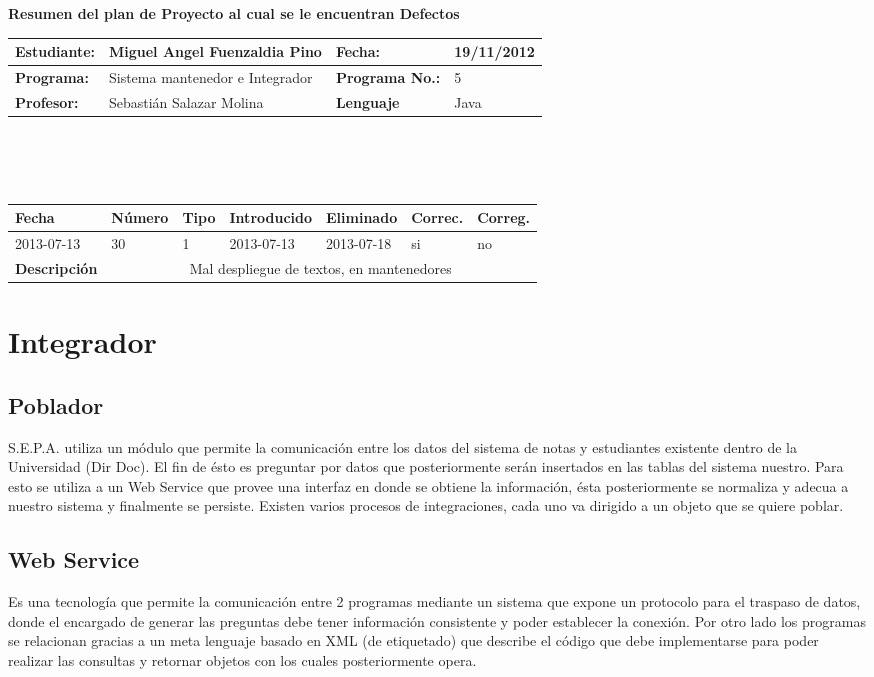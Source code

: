 \documentclass[a4paper,12pt,openany,oneside]{book}
\begin{document}
\textbf{Resumen del plan de Proyecto al cual se le encuentran Defectos}\\
\begin{tabular}{| l | l | l | l |}
\hline
\textbf{Estudiante:} & Miguel Angel Fuenzaldia Pino & \textbf{Fecha:} & 19/11/2012\\
\hline
\textbf{Programa:} & Sistema mantenedor e Integrador & \textbf{Programa No.:} & 5\\
\hline
\textbf{Profesor:} & Sebastián Salazar Molina & \textbf{Lenguaje} & Java  \\
\hline
\end{tabular}
\\\\\\
\begin{tabular}{| l | l | l | l | l | l | l |}
\hline
\textbf{Fecha} & \textbf{Número} & \textbf{Tipo} & \textbf{Introducido} & \textbf{Eliminado} & \textbf{Correc.} & \textbf{Correg.}\\
\hline
2013-07-13 & 30 & 1 & 2013-07-13 & 2013-07-18 & si & no \\
\hline
\textbf{Descripción} & \multicolumn{6}{|c|}{Mal despliegue de textos, en mantenedores} \\
\hline
\end{tabular}

\chapter{Integrador}
\thispagestyle{empty}
\section{Poblador}
S.E.P.A. utiliza un módulo que permite la comunicación entre los datos del sistema de notas y estudiantes existente dentro de la Universidad (Dir Doc). El fin de ésto es preguntar por datos que posteriormente serán insertados en las tablas del sistema nuestro. Para esto se utiliza a un Web Service que provee una interfaz en donde se obtiene la información, ésta posteriormente se normaliza y adecua a nuestro sistema y finalmente se persiste. Existen varios procesos de integraciones, cada uno va dirigido a un objeto que se quiere poblar.
\section{Web Service}
Es una tecnología que permite la comunicación entre 2 programas mediante un sistema que expone un protocolo para el traspaso de datos, donde el encargado de generar las preguntas debe tener información consistente y poder establecer la conexión. Por otro lado los programas se relacionan gracias a un meta lenguaje basado en XML (de etiquetado) que describe el código que debe implementarse para poder realizar las consultas y retornar objetos con los cuales posteriormente opera.
\end{document}

